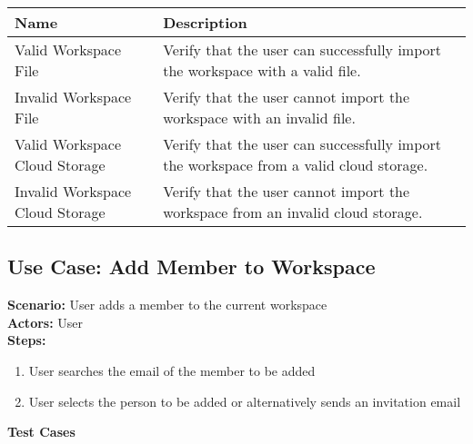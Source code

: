 \documentclass{article}
\begin{document}
            \begin{longtable}{|p{}|p{}|}
            \hline
            \textbf{Name} & \textbf{Description} \\
            \hline
            Valid Workspace File & Verify that the user can successfully import the workspace with a valid file. \\
\hline
Invalid Workspace File & Verify that the user cannot import the workspace with an invalid file. \\
\hline
Valid Workspace Cloud Storage & Verify that the user can successfully import the workspace from a valid cloud storage. \\
\hline
Invalid Workspace Cloud Storage & Verify that the user cannot import the workspace from an invalid cloud storage. \\
\hline
\end{longtable}\subsection{\textbf{Use Case: Add Member to Workspace}}
\textbf{Scenario:} User adds a member to the current workspace\\
\textbf{Actors:} User\\
\textbf{Steps:}
\begin{enumerate}
\item User searches the email of the member to be added
\item User selects the person to be added or alternatively sends an invitation email
\end{enumerate}
\textbf{Test Cases}
\end{document}
